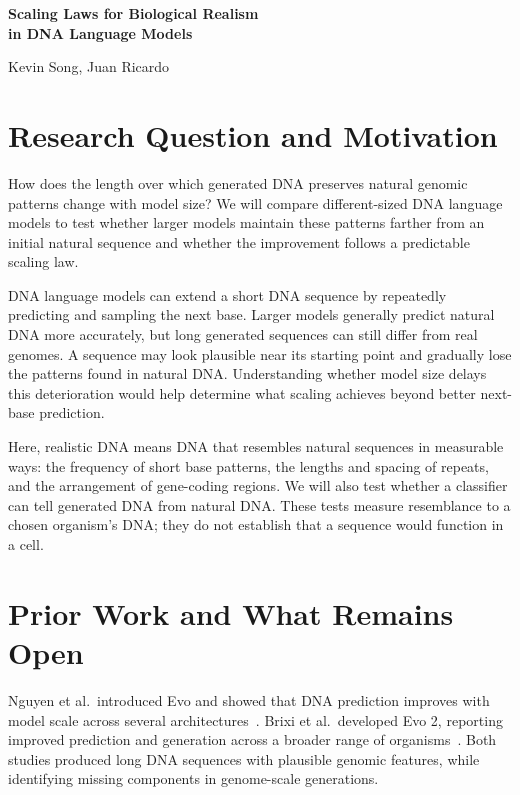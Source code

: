 \documentclass[11pt,letterpaper]{article}
\begin{document}
\begin{center}
{\Large\bfseries Scaling Laws for Biological Realism\\[3pt] in DNA Language Models}\par
\vspace{5pt}
{Kevin Song, Juan Ricardo}
\end{center}
\vspace{-5pt}

\section{Research Question and Motivation}
How does the length over which generated DNA preserves natural genomic patterns change with model size? We will compare different-sized DNA language models to test whether larger models maintain these patterns farther from an initial natural sequence and whether the improvement follows a predictable scaling law.

DNA language models can extend a short DNA sequence by repeatedly predicting and sampling the next base. Larger models generally predict natural DNA more accurately, but long generated sequences can still differ from real genomes. A sequence may look plausible near its starting point and gradually lose the patterns found in natural DNA. Understanding whether model size delays this deterioration would help determine what scaling achieves beyond better next-base prediction.

Here, realistic DNA means DNA that resembles natural sequences in measurable ways: the frequency of short base patterns, the lengths and spacing of repeats, and the arrangement of gene-coding regions. We will also test whether a classifier can tell generated DNA from natural DNA. These tests measure resemblance to a chosen organism's DNA; they do not establish that a sequence would function in a cell.

\section{Prior Work and What Remains Open}
Nguyen et al.\ introduced Evo and showed that DNA prediction improves with model scale across several architectures~\cite{evo}. Brixi et al.\ developed Evo 2, reporting improved prediction and generation across a broader range of organisms~\cite{evo2}. Both studies produced long DNA sequences with plausible genomic features, while identifying missing components in genome-scale generations.
\end{document}
